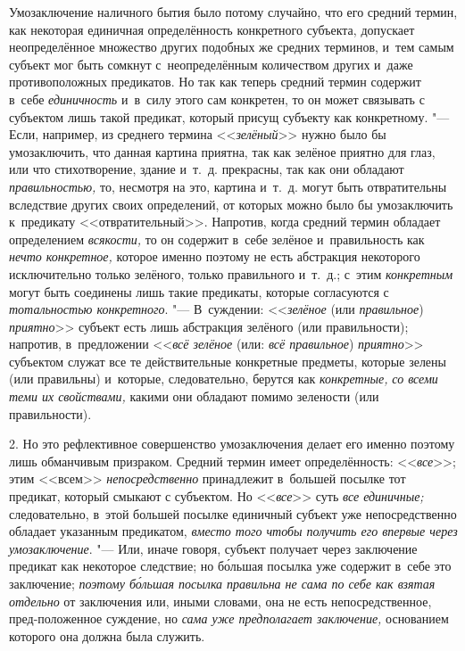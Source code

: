 Умозаключение наличного бытия было потому случайно, что его
средний термин, как некоторая единичная определённость конкретного
субъекта, допускает неопределённое множество других подобных же средних
терминов, и~тем самым субъект мог быть сомкнут с~неопределённым количеством
других и~даже противоположных предикатов. Но так как теперь средний термин
содержит в~себе {\em единичность}
и~в~силу этого сам конкретен, то он может связывать с
субъектом лишь такой предикат, который присущ субъекту как конкретному. "---
Если, например, из среднего термина
<<{\em зелёный}>> нужно
было бы умозаключить, что данная картина приятна, так как зелёное приятно
для глаз, или что стихотворение, здание и~т.~д. прекрасны, так как они
обладают {\em правильностью,}
то, несмотря на это, картина и~т.~д. могут быть отвратительны
вследствие других своих определений, от которых можно было бы умозаключить
к~предикату <<отвратительный>>. Напротив, когда средний термин обладает
определением {\em всякости,}
то он содержит в~себе зелёное и~правильность как
{\em нечто конкретное,}
которое именно поэтому не есть абстракция некоторого
исключительно только зелёного, только правильного и~т.~д.; с~этим
{\em конкретным} могут
быть соединены лишь такие предикаты, которые согласуются с
{\em тотальностью конкретного}. "---
В~суждении:
<<{\em зелёное} (или
{\em правильное})
{\em приятно}>> субъект
есть лишь абстракция зелёного (или правильности); напротив, в~предложении
<<{\em всё зелёное} (или:
{\em всё правильное})
{\em приятно}>> субъектом
служат все те действительные конкретные предметы, которые зелены (или
правильны) и~которые, следовательно, берутся как
{\em конкретные,}
{\em со всеми теми их свойствами,}
какими они обладают помимо зелености (или правильности).

2. Но это рефлективное совершенство умозаключения делает его
именно поэтому лишь обманчивым призраком. Средний термин имеет
определённость: <<{\em все}>>; этим <<всем>> {\em непосредственно}
принадлежит в~большей посылке тот предикат, который смыкают с
субъектом. Но <<{\em все}>> суть {\em все единичные;}
следовательно, в~этой большей посылке единичный субъект уже
непосредственно обладает указанным предикатом,
{\em вместо того чтобы получить его
впервые через умозаключение}. "--- Или, иначе говоря, субъект
получает через заключение предикат как некоторое следствие; но б\'{о}льшая
посылка уже содержит в~себе это заключение;
{\em поэтому б\'{о}льшая посылка правильна не сама
по себе как взятая отдельно} от заключения или, иными
словами, она не есть непосредственное, пред-положенное суждение, но
{\em сама уже предполагает заключение,}
основанием которого она должна была служить.

